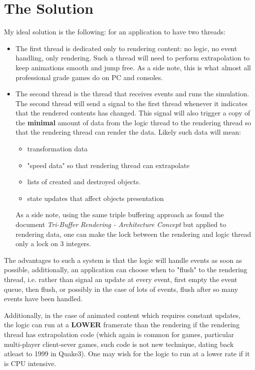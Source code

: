 \documentclass[a4paper,11pt]{article}
\begin{document}
\section{The Solution}
\begin{indenter}{2cm}

My ideal solution is the following: for an application to have two threads:

\begin{itemize}
\item The first thread is dedicated only to rendering content: no logic, no event
handling, only rendering. Such a thread will need to perform extrapolation
to keep animations smooth and jump free. As a side note, this is what almost all
professional grade games do on PC and consoles. 
\item The second thread is the thread that receives events and runs the simulation.
The second thread will send a signal to the first thread whenever it indicates
that the rendered contents has changed. This signal will also trigger a copy
of the \textbf{minimal} amount of data from the logic thread to the rendering thread
so that the rendering thread can render the data. Likely such data will mean:
    \begin{itemize}
    \item transformation data 
    \item "speed data" so that rendering thread can extrapolate
    \item lists of created and destroyed objects.
    \item state updates that affect objects presentation
    \end{itemize}
As a side note, using the same triple buffering approach as found the document \textit{Tri-Buffer Rendering - Architecture Concept} but applied to rendering data, 
one can make the lock between the rendering and logic thread only a 
lock on 3 integers.
\end{itemize}

The advantages to such a system is that the logic will handle events as soon as possible,
additionally, an application can choose when to "flush" to the rendering thread, i.e.
rather than signal an update at every event, first empty the event queue, then flush,
or possibly in the case of lots of events, flush after so many events have been handled.

Additionally, in the case of animated content which requires constant updates,
the logic can run at a \textbf{LOWER} framerate than the rendering if the rendering thread
has extrapolation code (which again is common for games, particular multi-player client-sever 
games, such code is not new technique, dating back atleast to 1999 in Quake3). One may
wish for the logic to run at a lower rate if it is CPU intensive.

\end{indenter}
\end{document}
